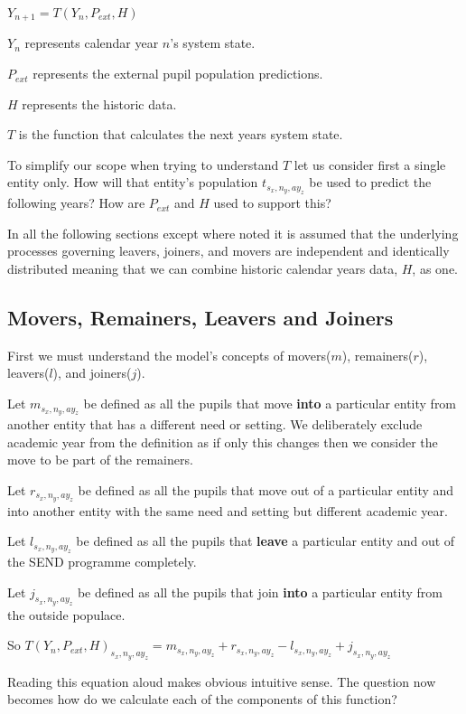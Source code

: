 \documentclass[margin=5mm]{article}
\begin{document}
$Y_{n+1} = T(Y_n,P_{ext}, H)$

$Y_n$ represents calendar year $n$'s system state.

$P_{ext}$ represents the external pupil population predictions.

$H$ represents the historic data.

$T$ is the function that calculates the next years system state.

To simplify our scope when trying to understand $T$ let us consider
first a single entity only.  How will that entity's population
$t_{s_x,n_y,ay_z}$ be used to predict the following years?  How are
$P_{ext}$ and $H$ used to support this?

In all the following sections except where noted it is assumed that
the underlying processes governing leavers, joiners, and movers are
independent and identically distributed meaning that we can combine
historic calendar years data, $H$, as one.

\subsection{Movers, Remainers, Leavers and Joiners}

First we must understand the model's concepts of movers($m$),
remainers($r$), leavers($l$), and joiners($j$).

Let $m_{s_x,n_y,ay_z}$ be defined as all the pupils that move
\textbf{into} a particular entity from another entity that has a
different need or setting.  We deliberately exclude academic year from
the definition as if only this changes then we consider the move to be
part of the remainers.

Let $r_{s_x,n_y,ay_z}$ be defined as all the pupils that move out of a
particular entity and into another entity with the same need and
setting but different academic year.

Let $l_{s_x,n_y,ay_z}$ be defined as all the pupils that
\textbf{leave} a particular entity and out of the SEND programme
completely.

Let $j_{s_x,n_y,ay_z}$ be defined as all the pupils that join
\textbf{into} a particular entity from the outside populace.

So $T(Y_n,P_{ext}, H)_{s_x,n_y,ay_z} = m_{s_x,n_y,ay_z} + r_{s_x,n_y,ay_z} -
l_{s_x,n_y,ay_z} + j_{s_x,n_y,ay_z} $

Reading this equation aloud makes obvious intuitive sense.  The
question now becomes how do we calculate each of the components of
this function?
\end{document}
